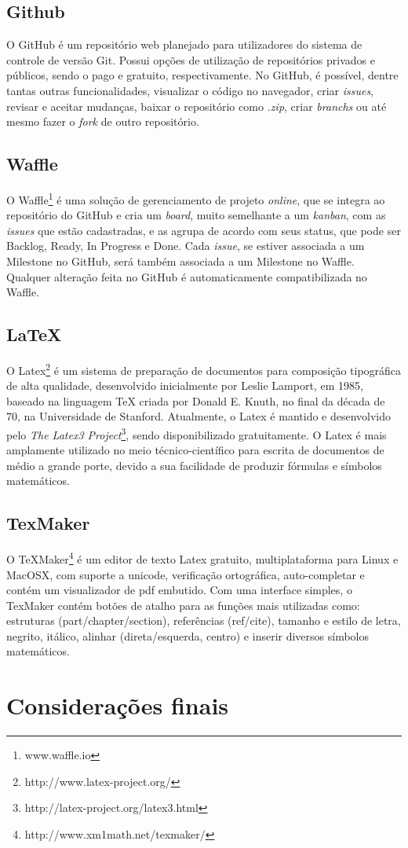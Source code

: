 \subsection{Github}
O GitHub é um repositório web planejado para utilizadores do sistema de controle de versão Git. Possui opções de utilização de repositórios privados e públicos, sendo o pago e gratuito, respectivamente.
No GitHub, é possível, dentre tantas outras funcionalidades, visualizar o código no navegador, criar \textit{issues}, revisar e aceitar mudanças, baixar o repositório como \textit{.zip}, criar \textit{branchs} ou até mesmo fazer o \textit{fork} de outro repositório.

\subsection{Waffle}
O Waffle\footnote{www.waffle.io} é uma solução de gerenciamento de projeto \textit{online}, que se integra ao repositório do GitHub e cria um \textit{board}, muito semelhante a um \textit{kanban}, com as \textit{issues} que estão cadastradas, e as agrupa de acordo com seus status, que pode ser Backlog, Ready, In Progress  e Done. Cada \textit{issue}, se estiver associada a um Milestone no GitHub, será também associada a um Milestone no Waffle. Qualquer alteração feita no GitHub é automaticamente compatibilizada no Waffle.

\subsection{LaTeX}
O Latex\footnote{http://www.latex-project.org/} é um sistema de preparação de documentos para composição tipográfica de alta qualidade, desenvolvido inicialmente por Leslie Lamport, em 1985, baseado na linguagem TeX criada por Donald E. Knuth, no final da década de 70, na Universidade de Stanford. Atualmente, o Latex é mantido e desenvolvido pelo \textit{The Latex3 Project}\footnote{http://latex-project.org/latex3.html}, sendo disponibilizado gratuitamente.
O Latex é mais amplamente utilizado no meio técnico-científico para escrita de documentos de médio a grande porte, devido a sua facilidade de produzir fórmulas e símbolos matemáticos. 

\subsection{TexMaker}
O TeXMaker\footnote{http://www.xm1math.net/texmaker/} é um editor de texto Latex gratuito, multiplataforma para Linux e MacOSX, com suporte a unicode, verificação ortográfica, auto-completar e contém um visualizador de pdf embutido.
Com uma interface simples, o TexMaker contém botões de atalho para as funções mais utilizadas como: estruturas (part/chapter/section), referências (ref/cite), tamanho e estilo de letra, negrito, itálico, alinhar (direta/esquerda, centro) e inserir diversos símbolos matemáticos.

\section{Considerações finais}